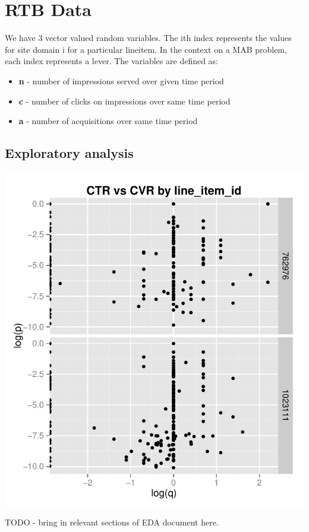 \documentclass[11pt,a4,singlespacing,titlepagenumber=on]{scrreprt}
\numberwithin{equation}{chapter} %
\theoremstyle{remark}
\begin{document}
\chapter{RTB Data}

We have 3 vector valued random variables. The ith index represents the values for site domain i for a particular lineitem. In the context on a MAB problem, each index represents a lever. The variables are defined as:
\begin{itemize}
	\item \textbf{n} - number of impressions served over given time period
	\item \textbf{c} - number of clicks on impressions over same time period 
	\item \textbf{a} - number of acquisitions over same time period
\end{itemize}

\section{Exploratory analysis}

\includegraphics{CTRvsCVR}

TODO - bring in relevant sections of EDA document here.
\end{document}
